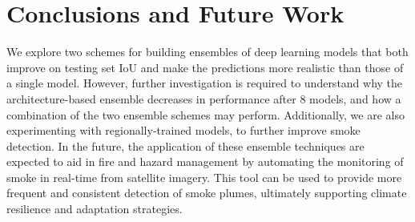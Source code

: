 \documentclass{article}
\begin{document}
\section{Conclusions and Future Work}
We explore two schemes for building ensembles of deep learning models that both improve on testing set IoU and make the predictions more realistic than those of a single model. However, further investigation is required to understand why the architecture-based ensemble decreases in performance after 8 models, and how a combination of the two ensemble schemes may perform. Additionally, we are also experimenting with regionally-trained models, to further improve smoke detection. In the future, the application of these ensemble techniques are expected to aid in fire and hazard management by automating the monitoring of smoke in real-time from satellite imagery. This tool can be used to provide more frequent and consistent detection of smoke plumes, ultimately supporting climate resilience and adaptation strategies.


\end{document}
